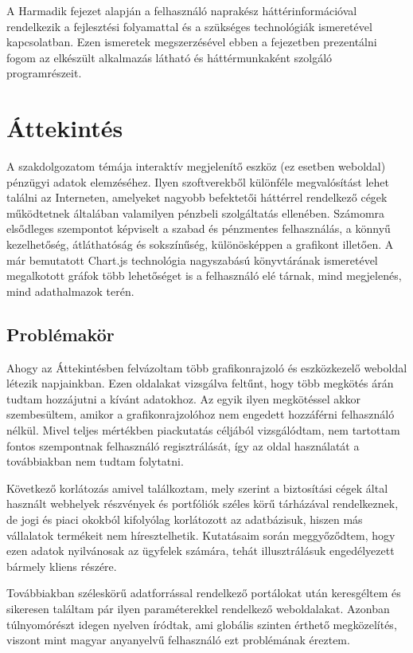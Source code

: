 
A Harmadik fejezet alapján a felhasználó naprakész háttérinformációval rendelkezik a fejlesztési folyamattal és a szükséges technológiák ismeretével kapcsolatban. Ezen ismeretek megszerzésével ebben a fejezetben prezentálni fogom az elkészült alkalmazás látható és háttérmunkaként szolgáló programrészeit.


\section{Áttekintés}

A szakdolgozatom témája interaktív megjelenítő eszköz (ez esetben weboldal) pénzügyi adatok elemzéséhez. Ilyen szoftverekből különféle megvalósítást lehet találni az Interneten, amelyeket nagyobb befektetői háttérrel rendelkező cégek működtetnek általában valamilyen pénzbeli szolgáltatás ellenében. Számomra elsődleges szempontot képviselt a szabad és pénzmentes felhasználás, a könnyű kezelhetőség, átláthatóság és sokszínűség, különösképpen a grafikont illetően. A már bemutatott Chart.js technológia nagyszabású könyvtárának ismeretével megalkotott gráfok több lehetőséget is a felhasználó elé tárnak, mind megjelenés, mind adathalmazok terén. 

\subsection{Problémakör}

Ahogy az Áttekintésben felvázoltam több grafikonrajzoló és eszközkezelő weboldal létezik napjainkban. Ezen oldalakat vizsgálva feltűnt, hogy több megkötés árán tudtam hozzájutni a kívánt adatokhoz. Az egyik ilyen megkötéssel akkor szembesültem, amikor a grafikonrajzolóhoz nem engedett hozzáférni felhasználó nélkül. Mivel teljes mértékben piackutatás céljából vizsgálódtam, nem tartottam fontos szempontnak felhasználó regisztrálását, így az oldal használatát a továbbiakban nem tudtam folytatni.

	Következő korlátozás amivel találkoztam, mely szerint a biztosítási cégek által használt webhelyek részvények és portfóliók széles körű tárházával rendelkeznek, de jogi és piaci okokból kifolyólag korlátozott az adatbázisuk, hiszen más vállalatok termékeit nem híresztelhetik. Kutatásaim során meggyőződtem, hogy ezen adatok nyilvánosak az ügyfelek számára, tehát illusztrálásuk engedélyezett bármely kliens részére.

	Továbbiakban széleskörű adatforrással rendelkező portálokat után keresgéltem és sikeresen találtam pár ilyen paraméterekkel rendelkező weboldalakat. Azonban túlnyomórészt idegen nyelven íródtak, ami globális szinten érthető megközelítés, viszont mint magyar anyanyelvű felhasználó ezt problémának éreztem. 

